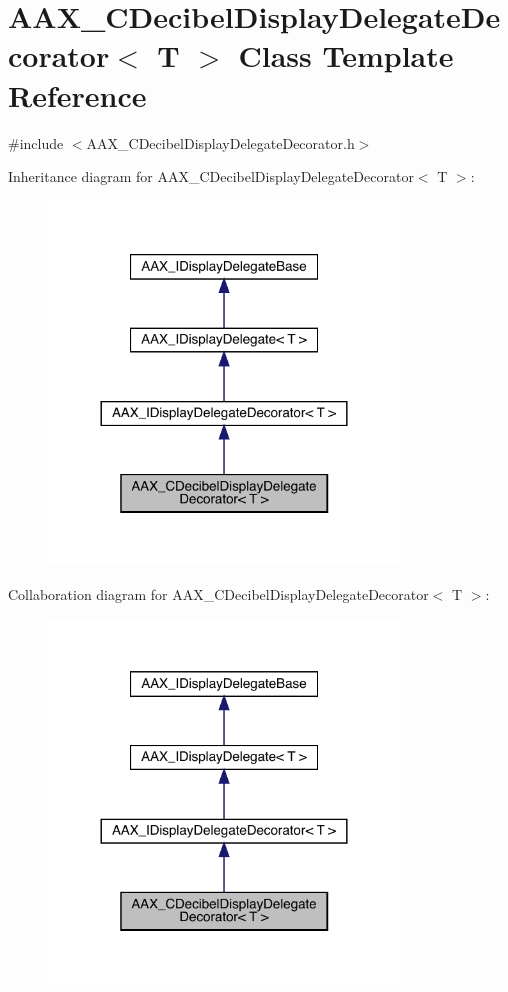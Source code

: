 \hypertarget{a01469}{}\section{A\+A\+X\+\_\+\+C\+Decibel\+Display\+Delegate\+Decorator$<$ T $>$ Class Template Reference}
\label{a01469}


{\ttfamily \#include $<$A\+A\+X\+\_\+\+C\+Decibel\+Display\+Delegate\+Decorator.\+h$>$}



Inheritance diagram for A\+A\+X\+\_\+\+C\+Decibel\+Display\+Delegate\+Decorator$<$ T $>$\+:
\nopagebreak
\begin{figure}[H]
\begin{center}
\leavevmode
\includegraphics[width=264pt]{a01468}
\end{center}
\end{figure}


Collaboration diagram for A\+A\+X\+\_\+\+C\+Decibel\+Display\+Delegate\+Decorator$<$ T $>$\+:
\nopagebreak
\begin{figure}[H]
\begin{center}
\leavevmode
\includegraphics[width=264pt]{a01467}
\end{center}
\end{figure}



